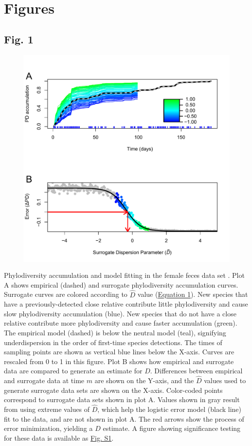 \documentclass{article}
\begin{document}
\section{Figures}
{\parindent0pt %
\subsection{Fig. 1}\label{sec:figure1}
\begin{figure}[ht]
	\centering
	\includegraphics[scale=0.80]{figs/Fig_1.pdf}
\end{figure}
Phylodiversity accumulation and model fitting in the female feces data set \cite{Caporaso2011}. Plot A shows empirical (dashed) and surrogate phylodiversity accumulation curves. Surrogate curves are colored according to \(\hat{D}\) value (\hyperref[sec:equation1]{Equation 1}). New species that have a previously-detected close relative contribute little phylodiversity and cause slow phylodiversity accumulation (blue). New species that do not have a close relative contribute more phylodiversity and cause faster accumulation (green). The empirical model (dashed) is below the neutral model (teal), signifying underdispersion in the order of first-time species detections. The times of sampling points are shown as vertical blue lines below the X-axis. Curves are rescaled from 0 to 1 in this figure. Plot B shows how empirical and surrogate data are compared to generate an estimate for \(D\). Differences between empirical and surrogate data at time \(m\) are shown on the Y-axis, and the \(\hat{D}\) values used to generate surrogate data sets are shown on the X-axis. Color-coded points correspond to surrogate data sets shown in plot A. Values shown in gray result from using extreme values of \(\hat{D}\), which help the logistic error model (black line) fit to the data, and are not shown in plot A. The red arrows show the process of error minimization, yielding a \(D\) estimate. A figure showing significance testing for these data is available as \hyperref[sec:figureS1]{Fig. S1}.
\newpage

}
\end{document}
